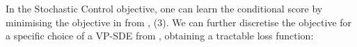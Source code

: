 In the Stochastic Control objective, one can learn the conditional score by minimising the objective in  from , (3). We can further discretise the objective for a specific choice of a VP-SDE from \textcite{song2021solving}, obtaining a tractable loss function:

